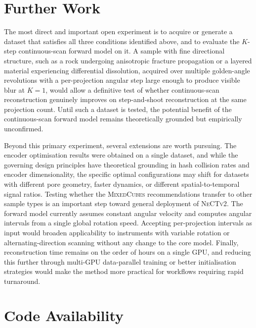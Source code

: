 \documentclass[12pt, a4paper, twoside]{report}
\newcommand{\NeCTv}{\textsc{NeCTv2}}
\newcommand{\MixedCubes}{\textsc{MixedCubes}}
\begin{document}
\section{Further Work}
\label{sec:conclusion_future}

The most direct and important open experiment is to acquire or generate a dataset that satisfies all three conditions identified above, and to evaluate the $K$-step continuous-scan forward model on it. A sample with fine directional structure, such as a rock undergoing anisotropic fracture propagation or a layered material experiencing differential dissolution, acquired over multiple golden-angle revolutions with a per-projection angular step large enough to produce visible blur at $K = 1$, would allow a definitive test of whether continuous-scan reconstruction genuinely improves on step-and-shoot reconstruction at the same projection count. Until such a dataset is tested, the potential benefit of the continuous-scan forward model remains theoretically grounded but empirically unconfirmed.

Beyond this primary experiment, several extensions are worth pursuing. The encoder optimisation results were obtained on a single dataset, and while the governing design principles have theoretical grounding in hash collision rates and encoder dimensionality, the specific optimal configurations may shift for datasets with different pore geometry, faster dynamics, or different spatial-to-temporal signal ratios. Testing whether the \MixedCubes{} recommendations transfer to other sample types is an important step toward general deployment of \NeCTv{}. The forward model currently assumes constant angular velocity and computes angular intervals from a single global rotation speed. Accepting per-projection intervals as input would broaden applicability to instruments with variable rotation or alternating-direction scanning without any change to the core model. Finally, reconstruction time remains on the order of hours on a single GPU, and reducing this further through multi-GPU data-parallel training or better initialisation strategies would make the method more practical for workflows requiring rapid turnaround.

\section*{Code Availability}
\end{document}
